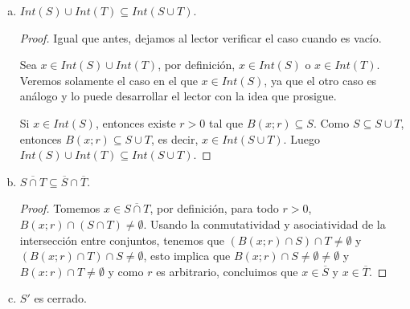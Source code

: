 \begin{itemize}[leftmargin=*]
\begin{enumerate}[a)]
        \begin{proof}
            El caso en que $Int(S \cap T)$ o $Int(S)\cap Int(T)$ son vacíos, verifican la propiedad de manera relativamente fácil.
            
            Sea $x \in Int(S \cap T)$, por definición, existe $r>0$ tal que $B(x;r) \subseteq S \cap T$. Como $S \cap T \subseteq S$ y $S \cap T \subseteq T$, entonces $B(x;r) \subseteq S$ y $B(x;r) \subseteq T$, es decir, $x \in Int(S)$ y $x \in Int(T)$, o lo que es lo mismo $x \in Int(S) \cap Int(T)$. Así, hemos probado que $Int(S \cap T)\subseteq Int(S) \cap Int(T)$.

            Ahora, sea $y \in Int(S) \cap Int(T)$, por definición, $y \in Int(S)$ y $y \in Int(T)$, de esta manera, existen $r_1,r_2>0$ tales que $B(y;r_1)\subseteq S$ y $B(y;r_2)\subseteq T$. Considere $r=\min\{r_1,r_2\}$, luego $B(y;r)\subseteq B(y;r_1)$ y $B(y;r) \subseteq B(y;r_2)$. De esta manera, $B(y;r) \subseteq S \cap T$, es decir, $y \in Int(S \cap T)$. Hemos probado, entonces, que $Int(S) \cap Int(T) \subseteq Int(S \cap T)$, lo cual completa la demostración.
        \end{proof}
        
        \item $Int(S) \cup Int(T) \subseteq Int(S \cup T)$.\\
        
        \begin{proof}
            Igual que antes, dejamos al lector verificar el caso cuando es vacío.

            Sea $x \in Int(S) \cup Int(T)$, por definición, $x \in Int(S)$ o $x \in Int(T)$. Veremos solamente el caso en el que $x \in Int(S)$, ya que el otro caso es análogo y lo puede desarrollar el lector con la idea que prosigue.

            Si $x \in Int(S)$, entonces existe $r>0$ tal que $B(x;r) \subseteq S$. Como $S \subseteq S \cup T$, entonces $B(x;r)\subseteq S \cup T$, es decir, $x \in Int(S \cup T)$. Luego $Int(S) \cup Int(T) \subseteq Int(S \cup T)$.
        \end{proof}
        
        \item $\overline{S\cap T}\subseteq \overline{S}\cap \overline{T}$.\\

        \begin{proof}
            Tomemos $x \in \overline{S\cap T}$, por definición, para todo $r>0$, $B(x;r)\cap (S\cap T) \neq \emptyset$. Usando la conmutatividad y asociatividad de la intersección entre conjuntos, tenemos que $(B(x;r)\cap S)\cap T\neq \emptyset$ y $(B(x;r)\cap T)\cap S\neq \emptyset$, esto implica que $B(x;r)\cap S\neq \emptyset \neq \emptyset$ y $B(x:r)\cap T\neq \emptyset$ y como $r$ es arbitrario, concluimos que $x \in \overline{S}$ y $x \in \overline{T}$.
        \end{proof}
        \item $S'$ es cerrado.\\
        

\end{enumerate}
\end{itemize}
